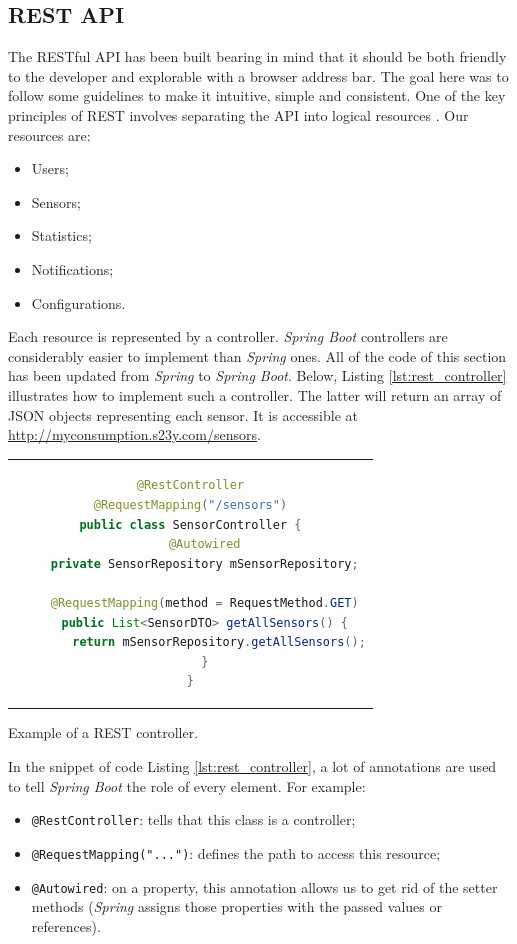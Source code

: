 \documentclass[a4paper, oneside, 11pt]{book}
\begin{document}
\subsection{REST API}
The RESTful API has been built bearing in mind that it should be both friendly to the developer and explorable with a browser address bar. The goal here was to follow some guidelines to make it intuitive, simple and consistent. One of the key principles of REST involves separating the API into logical resources \cite{Sahni:online}. Our resources are: 
\begin{itemize}
	\item Users;
	\item Sensors;
	\item Statistics;
	\item Notifications; 
	\item Configurations.
\end{itemize}

Each resource is represented by a controller. \textit{Spring Boot} controllers are considerably easier to implement than \textit{Spring} ones. All of the code of this section has been updated from \textit{Spring} to \textit{Spring Boot}. Below, Listing \ref{lst:rest_controller} illustrates how to implement such a controller. The latter will return an array of JSON objects representing each sensor. It is accessible at \url{http://myconsumption.s23y.com/sensors}.\\

\begin{listing}[!h]
	\centering
	\begin{tabular}{c}
		\begin{lstlisting}[language=Java]
@RestController
@RequestMapping("/sensors")
public class SensorController {
    @Autowired
    private SensorRepository mSensorRepository;

    @RequestMapping(method = RequestMethod.GET)
    public List<SensorDTO> getAllSensors() {
        return mSensorRepository.getAllSensors();
    }
}
		\end{lstlisting}
	\end{tabular}	
	\caption{Example of a REST controller.}
	\label{lst:rest_controller}
\end{listing}

In the snippet of code Listing \ref{lst:rest_controller}, a lot of annotations are used to tell \textit{Spring Boot} the role of every element. For example:
\begin{itemize}
	\item \texttt{@RestController}: tells that this class is a controller;
	\item \texttt{@RequestMapping("...")}: defines the path to access this resource;
	\item \texttt{@Autowired}: on a property, this annotation allows us to get rid of the setter methods (\textit{Spring} assigns those properties with the passed values or references).
\end{itemize}
\end{document}
